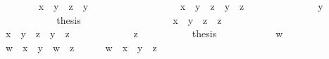 \begin{isabellebody}
\isanewline
\ \ \ \ \ \ \isamarkupfalse%
\ {\isachardoublequoteopen}x\ {\isasymsqinter}\ {\isacharparenleft}y\ {\isasymsqinter}\ z{\isacharparenright}\ {\isasymsqsubseteq}\ y{\isachardoublequoteclose}\isanewline
\ \ \ \ \ \ \isamarkupfalse%
\ {\isacharminus}\isanewline
\ \ \ \ \ \ \ \ \isamarkupfalse%
\ {\isachardoublequoteopen}x\ {\isasymsqinter}\ {\isacharparenleft}y\ {\isasymsqinter}\ z{\isacharparenright}\ {\isasymsqsubseteq}\ y\ {\isasymsqinter}\ z{\isachardoublequoteclose}\ \isacommand{{\isachardot}{\isachardot}}\isamarkupfalse%
\isanewline
\ \ \ \ \ \ \ \ \isamarkupfalse%
\ \isamarkupfalse%
\ {\isachardoublequoteopen}{\isasymdots}\ {\isasymsqsubseteq}\ y{\isachardoublequoteclose}\ \isacommand{{\isachardot}{\isachardot}}\isamarkupfalse%
\isanewline
\ \ \ \ \ \ \ \ \isamarkupfalse%
\ \isamarkupfalse%
\ {\isacharquery}thesis\ \isacommand{{\isachardot}}\isamarkupfalse%
\isanewline
\ \ \ \ \ \ \isamarkupfalse%
\isanewline
\ \ \ \ \isamarkupfalse%
\isanewline
\ \ \ \ \isamarkupfalse%
\ {\isachardoublequoteopen}x\ {\isasymsqinter}\ {\isacharparenleft}y\ {\isasymsqinter}\ z{\isacharparenright}\ {\isasymsqsubseteq}\ z{\isachardoublequoteclose}\isanewline
\ \ \ \ \isamarkupfalse%
\ {\isacharminus}\isanewline
\ \ \ \ \ \ \isamarkupfalse%
\ {\isachardoublequoteopen}x\ {\isasymsqinter}\ {\isacharparenleft}y\ {\isasymsqinter}\ z{\isacharparenright}\ {\isasymsqsubseteq}\ y\ {\isasymsqinter}\ z{\isachardoublequoteclose}\ \isacommand{{\isachardot}{\isachardot}}\isamarkupfalse%
\isanewline
\ \ \ \ \ \ \isamarkupfalse%
\ \isamarkupfalse%
\ {\isachardoublequoteopen}{\isasymdots}\ {\isasymsqsubseteq}\ z{\isachardoublequoteclose}\ \isacommand{{\isachardot}{\isachardot}}\isamarkupfalse%
\isanewline
\ \ \ \ \ \ \isamarkupfalse%
\ \isamarkupfalse%
\ {\isacharquery}thesis\ \isacommand{{\isachardot}}\isamarkupfalse%
\isanewline
\ \ \ \ \isamarkupfalse%
\isanewline
\ \ \ \ \isamarkupfalse%
\ w\ \isamarkupfalse%
\ {\isachardoublequoteopen}w\ {\isasymsqsubseteq}\ x\ {\isasymsqinter}\ y{\isachardoublequoteclose}\ \ {\isachardoublequoteopen}w\ {\isasymsqsubseteq}\ z{\isachardoublequoteclose}\isanewline
\ \ \ \ \isamarkupfalse%
\ {\isachardoublequoteopen}w\ {\isasymsqsubseteq}\ x\ {\isasymsqinter}\ {\isacharparenleft}y\ {\isasymsqinter}\ z{\isacharparenright}{\isachardoublequoteclose}\isanewline

\end{isabellebody}
